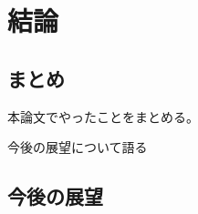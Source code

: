 \chapter{結論}\label{chap:conclusion}

\section{まとめ}\label{ux307eux3068ux3081}

本論文でやったことをまとめる。

今後の展望について語る

\section{今後の展望}\label{ux4ecaux5f8cux306eux5c55ux671b}
